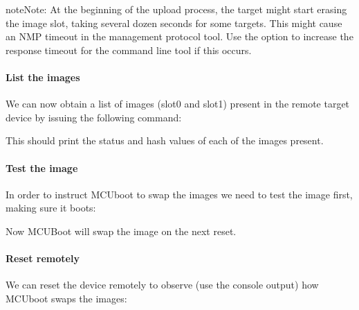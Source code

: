 \documentclass[letterpaper,10pt,english]{sphinxmanual}
\begin{document}
\begin{sphinxadmonition}{note}{Note:}
At the beginning of the upload process, the target might start erasing
the image slot, taking several dozen seconds for some targets.  This might
cause an NMP timeout in the management protocol tool. Use the
 option to increase the response timeout for the
 command line tool if this occurs.
\end{sphinxadmonition}


\paragraph{List the images}
\label{\detokenize{fota/smp_svr:list-the-images}}
We can now obtain a list of images (slot\sphinxhyphen{}0 and slot\sphinxhyphen{}1) present in the remote
target device by issuing the following command:

\begin{sphinxVerbatim}[commandchars=\\\{\}]
\end{sphinxVerbatim}

This should print the status and hash values of each of the images present.


\paragraph{Test the image}
\label{\detokenize{fota/smp_svr:test-the-image}}
In order to instruct MCUboot to swap the images we need to test the image first,
making sure it boots:

\begin{sphinxVerbatim}[commandchars=\\\{\}]
\end{sphinxVerbatim}

Now MCUBoot will swap the image on the next reset.


\paragraph{Reset remotely}
\label{\detokenize{fota/smp_svr:reset-remotely}}
We can reset the device remotely to observe (use the console output) how
MCUboot swaps the images:
\end{document}
